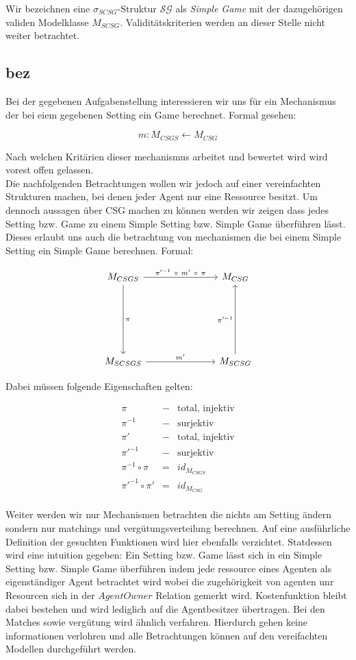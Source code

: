 \documentclass[12pt]{article}
\theoremstyle{break}
\begin{document}
\noindent
Wir bezeichnen eine $\sigma_{SCSG}$-Struktur $\mathcal{SG}$ als \textit{Simple Game} mit der dazugehörigen validen Modelklasse $M_{SCSG}$. Validitätskriterien werden an dieser Stelle nicht weiter betrachtet.


\subsection{bez}
\label{bez}

Bei der gegebenen Aufgabenstellung interessieren wir uns für ein Mechanismus der bei eiem gegebenen Setting ein Game berechnet. Formal gesehen:

\begin{equation}
  m: M_{CSGS} \leftarrow M_{CSG}
\end{equation}

Nach welchen Kritärien dieser mechanismus arbeitet und bewertet wird wird vorest offen gelassen.\\

Die nachfolgenden Betrachtungen wollen wir jedoch auf einer vereinfachten Strukturen machen, bei denen jeder Agent nur eine Ressource besitzt. Um dennoch aussagen über CSG machen zu können werden wir zeigen dass jedes Setting bzw. Game zu einem Simple Setting bzw. Simple Game überführen lässt. Dieses erlaubt uns auch die betrachtung von mechanismen die bei einem Simple Setting ein Simple Game berechnen. Formal:

\[
\begin{tikzcd}[column sep=1in,row sep=1in]
M_{CSGS} \arrow{d}{\pi} \arrow{r}{\pi'^{-1}\ \circ\  m'\ \circ\ \pi} & M_{CSG} \\
M_{SCSGS} \arrow{r}{m'} & M_{SCSG} \arrow{u}{\pi'^{-1}}
\end{tikzcd}
\]

Dabei müssen folgende Eigenschaften gelten:


\begin{eqnarray}
  \pi &-&\text{total, injektiv} \\
  \pi^{-1}&-&\text{surjektiv} \\
  \pi' &-&\text{total, injektiv} \\
  \pi'^{-1}&-&\text{surjektiv} \\
  \pi^{-1}\circ\pi &=& id_{M_{CSGS}} \\
  \pi'^{-1}\circ\pi' &=& id_{M_{CSG}} \\
\end{eqnarray}

Weiter werden wir nur Mechanismen betrachten die nichts am Setting ändern sondern nur matchings und vergütungsverteilung berechnen.
Auf eine ausführliche Definition der gesuchten Funktionen wird hier ebenfalls verzichtet. Statdessen wird eine intuition gegeben: Ein Setting bzw. Game lässt sich in ein Simple Setting bzw. Simple Game überführen indem jede ressource eines Agenten als eigenständiger Agent betrachtet wird wobei die zugehörigkeit von agenten unr Resourcen sich in der $AgentOwner$ Relation gemerkt wird. Kostenfunktion bleibt dabei bestehen und wird lediglich auf die Agentbesitzer übertragen. Bei den Matches sowie vergütung wird ähnlich verfahren. Hierdurch gehen keine informationen verlohren und alle Betrachtungen können auf den vereifachten Modellen durchgeführt werden.
\end{document}
